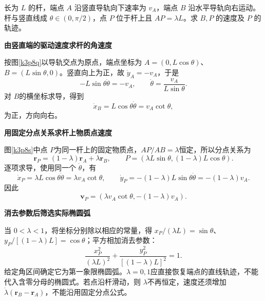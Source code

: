\begin{question}\begin{example}[滑杆上任一点的运动]\label{k3p8}
长为 $L$ 的杆，端点 $A$ 沿竖直导轨向下速率为 $v_A$，端点 $B$ 沿水平导轨向右运动。杆与竖直线成 $\theta\in(0,\pi/2)$，点 $P$ 位于杆上且 $AP=\lambda L$。求 $B,P$ 的速度及 $P$ 的轨迹。\end{example}
\end{question}
\begin{solution}\textbf{由竖直端的驱动速度求杆的角速度}\par\nobreak
按图\ref{k3p8q}以导轨交点为原点，端点坐标为 $A=(0,L\cos\theta)$、$B=(L\sin\theta,0)$。竖直向上为正，故 $\dot y_A=-v_A$，于是
\[-L\sin\theta\dot\theta=-v_A,\qquad
\dot\theta=\frac{v_A}{L\sin\theta}.\]
对 $B$的横坐标求导，得到
\[\dot x_B=L\cos\theta\dot\theta
 =\boxed{v_A\cot\theta},\]
为正，方向向右。



\par\medskip{}\noindent\textbf{用固定分点关系求杆上物质点速度}\par\nobreak
图\ref{k3p8s}中点 $P$为同一杆上的固定物质点，$AP/AB=\lambda$恒定，所以分点关系为
\[\bm r_P=(1-\lambda)\bm r_A+\lambda\bm r_B,
\qquad P=(\lambda L\sin\theta,(1-\lambda)L\cos\theta).\]
逐项求导，使用同一个 $\dot\theta$，有
\[\dot x_P=\lambda L\cos\theta\dot\theta
           =\lambda v_A\cot\theta,\qquad
\dot y_P=-(1-\lambda)L\sin\theta\dot\theta
           =-(1-\lambda)v_A.\]
因此
\[\boxed{\bm v_P=(\lambda v_A\cot\theta,-(1-\lambda)v_A)}.\]



\par\medskip{}\noindent\textbf{消去参数后筛选实际椭圆弧}\par\nobreak
当 $0<\lambda<1$，将坐标分别除以相应的常量，得 $x_P/(\lambda L)=\sin\theta$、$y_P/[(1-\lambda)L]=\cos\theta$；平方相加消去参数：
\[\boxed{\frac{x_P^2}{(\lambda L)^2}
       +\frac{y_P^2}{[(1-\lambda)L]^2}=1}.\]
给定角区间确定它为第一象限椭圆弧。$\lambda=0,1$应直接恢复端点的直线轨迹，不能代入含零分母的椭圆式。若点沿杆滑动，则 $\lambda$不再恒定，速度还须增加 $\dot\lambda(\bm r_B-\bm r_A)$，不能沿用固定分点公式。


\end{solution}
